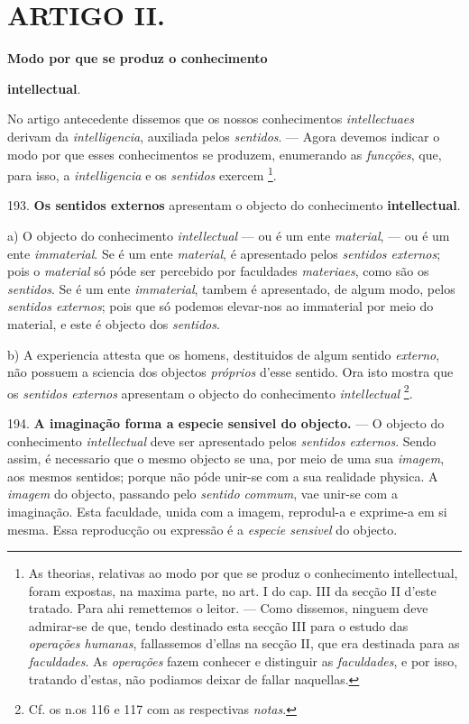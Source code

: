 
\section*{ARTIGO II.}

 \textbf{Modo por que se produz o conhecimento}

\textbf{intellectual}.


No artigo antecedente dissemos que os nossos conhecimentos \emph{intellectuaes} derivam da \emph{intelligencia}, auxiliada pelos \emph{sentidos}. --- Agora devemos indicar o modo por que esses conhecimentos se produzem, enumerando as \emph{funcções}, que, para isso, a \emph{intelligencia} e os \emph{sentidos} exercem \footnote{As theorias, relativas ao modo por que se produz o conhecimento intellectual, foram expostas, na maxima parte, no art. I do cap. III da secção II d'este tratado. Para ahi remettemos o leitor. --- Como dissemos, ninguem deve admirar-se de que, tendo destinado esta secção III para o estudo das \emph{operações humanas}, fallassemos d'ellas na secção II, que era destinada para as \emph{faculdades}. As \emph{operações} fazem conhecer e distinguir as \emph{faculdades}, e por isso, tratando d'estas, não podiamos deixar de fallar naquellas.}.

193. \textbf{Os sentidos externos} apresentam o objecto do conhecimento \textbf{intellectual}.

a) O objecto do conhecimento \emph{intellectual} --- ou é um ente   \emph{material}, --- ou é um ente \emph{immaterial}. Se é um ente \emph{material}, é apresentado pelos \emph{sentidos externos}; pois o \emph{material} só póde ser percebido por faculdades \emph{materiaes}, como são os \emph{sentidos}. Se é um ente \emph{immaterial}, tambem é apresentado, de algum modo, pelos \emph{sentidos externos}; pois que só podemos elevar-nos ao immaterial por meio do material, e este é objecto dos \emph{sentidos}.

b) A experiencia attesta que os homens, destituidos de algum sentido \emph{externo}, não possuem a sciencia dos objectos \emph{próprios} d'esse sentido. Ora isto mostra que os \emph{sentidos externos} apresentam o objecto do conhecimento \emph{intellectual} \footnote{Cf. os n.os 116 e 117 com as respectivas \emph{notas}.}.

194. \textbf{A imaginação forma a especie sensivel do objecto.} --- O objecto do conhecimento \emph{intellectual} deve ser apresentado pelos \emph{sentidos externos}. Sendo assim, é necessario que o mesmo objecto se una, por meio de uma sua \emph{imagem}, aos mesmos sentidos; porque não póde unir-se com a sua realidade physica. A \emph{imagem} do objecto, passando pelo \emph{sentido commum}, vae unir-se com a imaginação. Esta faculdade, unida com a imagem, reprodul-a e exprime-a em si mesma. Essa reproducção ou expressão é a \emph{especie sensivel} do objecto.

